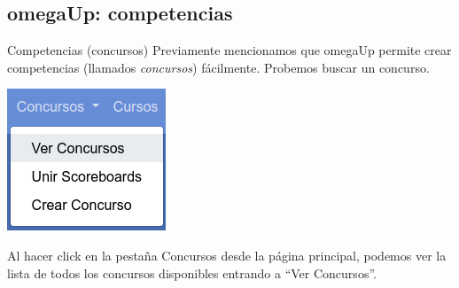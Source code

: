 \documentclass{beamer}
\begin{document}
    \subsection{omegaUp: competencias}
    \begin{frame}
    \end{frame}

    \begin{frame}{Competencias (concursos)}
        Previamente mencionamos que omegaUp permite crear competencias (llamados \textit{concursos}) fácilmente. \pause Probemos buscar un concurso. \vspace{8pt} \pause

        \begin{minipage}{.35\linewidth}
            \includegraphics[width=.9\linewidth]{./ou_contest_bar.png}
        \end{minipage}\pause
        \begin{minipage}{.64\linewidth}
            Al hacer click en la pestaña Concursos desde la página principal, podemos ver la lista de todos los concursos disponibles entrando a ``Ver Concursos''.
        \end{minipage}
    \end{frame}
\end{document}
